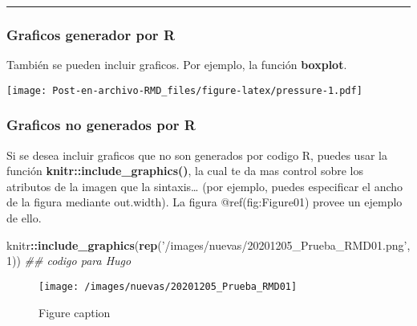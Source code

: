\documentclass[]{article}
\newenvironment{Shaded}{\begin{snugshade}}{\end{snugshade}}
\newcommand{\CommentTok}[1]{\textcolor[rgb]{0.56,0.35,0.01}{\textit{#1}}}
\newcommand{\DataTypeTok}[1]{\textcolor[rgb]{0.13,0.29,0.53}{#1}}
\newcommand{\DecValTok}[1]{\textcolor[rgb]{0.00,0.00,0.81}{#1}}
\newcommand{\KeywordTok}[1]{\textcolor[rgb]{0.13,0.29,0.53}{\textbf{#1}}}
\newcommand{\NormalTok}[1]{#1}
\newcommand{\OperatorTok}[1]{\textcolor[rgb]{0.81,0.36,0.00}{\textbf{#1}}}
\newcommand{\StringTok}[1]{\textcolor[rgb]{0.31,0.60,0.02}{#1}}
\begin{document}
\begin{center}\rule{0.5\linewidth}{\linethickness}\end{center}

\hypertarget{graficos-generador-por-r}{%
\subsubsection{Graficos generador por
R}\label{graficos-generador-por-r}}

También se pueden incluir graficos. Por ejemplo, la función
\textbf{boxplot}.

\begin{Shaded}
\end{Shaded}

\texttt{[image: Post-en-archivo-RMD\_files/figure-latex/pressure-1.pdf]}

\hypertarget{graficos-no-generados-por-r}{%
\subsubsection{Graficos no generados por
R}\label{graficos-no-generados-por-r}}

Si se desea incluir graficos que no son generados por codigo R, puedes
usar la función \textbf{knitr::include\_graphics()}, la cual te da mas
control sobre los atributos de la imagen que la sintaxis\ldots{} (por
ejemplo, puedes especificar el ancho de la figura mediante out.width).
La figura @ref(fig:Figure01) provee un ejemplo de ello.

\begin{Shaded}
\begin{Highlighting}[]
\NormalTok{knitr}\OperatorTok{::}\KeywordTok{include_graphics}\NormalTok{(}\KeywordTok{rep}\NormalTok{(}\StringTok{'/images/nuevas/20201205_Prueba_RMD01.png'}\NormalTok{, }\DecValTok{1}\NormalTok{)) }\CommentTok{## codigo para Hugo}
\end{Highlighting}
\end{Shaded}

\begin{figure}

{\centering \texttt{[image: /images/nuevas/20201205\_Prueba\_RMD01]} 

}

\caption{Figure caption}\label{fig:Figure01}
\end{figure}
\end{document}
